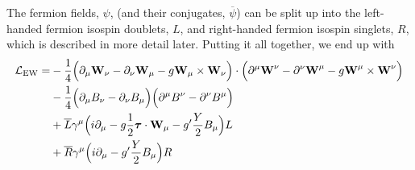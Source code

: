 The fermion fields, $\psi$, (and their conjugates, $\overline{\psi}$)
can be split up into the 
left-handed fermion isospin doublets, $L$,  and right-handed
fermion isospin singlets, $R$, which is described in more detail later.
Putting it all together, we end up with
\begin{equation}
\begin{aligned}
\mathcal{L}_{\textrm{EW}} = 
& -\frac{1}{4}\Big(\partial_{\mu}\textbf{W}_{\nu} - \partial_{\nu}\textbf{W}_{\mu} - g \textbf{W}_{\mu}\times \textbf{W}_{\nu}\Big) \cdot \Big(\partial^{\mu}\textbf{W}^{\nu} - \partial^{\nu}\textbf{W}^{\mu} - g \textbf{W}^{\mu}\times \textbf{W}^{\nu}\Big)  \\
& -\frac{1}{4}\Big(\partial_{\mu} B_{\nu} - \partial_{\nu} B_{\mu}\Big) 
\Big(\partial^{\mu} B^{\nu} - \partial^{\nu} B^{\mu}\Big)\\
&+\overline{L}\gamma^{\mu}\Big( i \partial_{\mu} - g \frac{1}{2} \boldsymbol{\tau} \cdot \textbf{W}_{\mu} - g' \frac{Y}{2} B_{\mu} \Big) L \\
&+ \overline{R} \gamma^{\mu} \Big( i \partial_{\mu} - g' \frac{Y}{2} B_{\mu} \Big) R
\end{aligned}
\label{eq:lagrangian_ew_expanded}
\end{equation}



